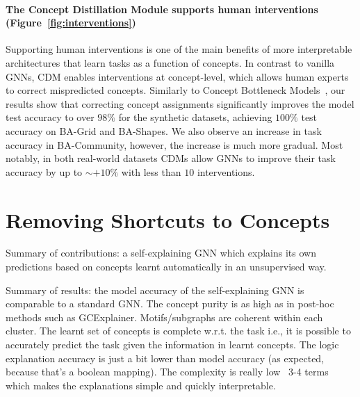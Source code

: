 \documentclass[withindex,glossary]{cam-thesis}
\theoremstyle{plain}
\theoremstyle{definition}
\theoremstyle{remark}
\begin{document}
\paragraph{The Concept Distillation Module supports human interventions (Figure~\ref{fig:interventions})}
Supporting human interventions is one of the main benefits of more interpretable architectures that learn tasks as a function of concepts. In contrast to vanilla GNNs, CDM enables interventions at concept-level, which allows human experts to correct mispredicted concepts. Similarly to Concept Bottleneck Models~\citep{koh2020concept}, our results show that correcting concept assignments significantly improves the model test accuracy to over $98\%$ for the synthetic datasets, achieving $100\%$ test accuracy on BA-Grid and BA-Shapes. We also observe an increase in task accuracy in BA-Community, however, the increase is much more gradual. Most notably, in both real-world datasets CDMs allow GNNs to improve their task accuracy by up to $\sim + 10\%$ with less than $10$ interventions.




\section{Removing Shortcuts to Concepts}


Summary of contributions: a self-explaining GNN which explains its own predictions based on concepts learnt automatically in an unsupervised way.

Summary of results: the model accuracy of the self-explaining GNN is comparable to a standard GNN. The concept purity is as high as in post-hoc methods such as GCExplainer. Motifs/subgraphs are coherent within each cluster. The learnt set of concepts is complete w.r.t. the task i.e., it is possible to accurately predict the task given the information in learnt concepts. The logic explanation accuracy is just a bit lower than model accuracy (as expected, because that's a boolean mapping). The complexity is really low ~3-4 terms which makes the explanations simple and quickly interpretable.
\end{document}
